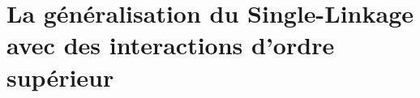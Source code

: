 \documentclass{these-ISSS} %
\begin{document}















\part{La généralisation du Single-Linkage avec des interactions d'ordre supérieur}
\end{document}
